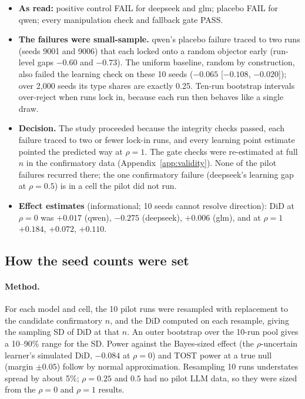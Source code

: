 \documentclass[11pt,letterpaper]{article}
\newcommand{\did}{\mathrm{DiD}}
\numberwithin{equation}{section}
\numberwithin{table}{section}
\numberwithin{figure}{section}
\numberwithin{algorithm}{section}
\begin{document}
\begin{itemize}
  \item \textbf{As read:} positive control FAIL for deepseek and glm; placebo FAIL for qwen; every manipulation check and fallback gate PASS.
  \item \textbf{The failures were small-sample.} qwen's placebo failure traced to two runs (seeds 9001 and 9006) that each locked onto a random objector early (run-level gaps $-0.60$ and $-0.73$). The uniform baseline, random by construction, also failed the learning check on these 10 seeds ($-0.065$ [$-0.108$, $-0.020$]); over 2{,}000 seeds its type shares are exactly 0.25. Ten-run bootstrap intervals over-reject when runs lock in, because each run then behaves like a single draw.
  \item \textbf{Decision.} The study proceeded because the integrity checks passed, each failure traced to two or fewer lock-in runs, and every learning point estimate pointed the predicted way at $\rho=1$. The gate checks were re-estimated at full $n$ in the confirmatory data (Appendix~\ref{app:validity}). None of the pilot failures recurred there; the one confirmatory failure (deepseek's learning gap at $\rho=0.5$) is in a cell the pilot did not run.
  \item \textbf{Effect estimates} (informational; 10 seeds cannot resolve direction): $\did$ at $\rho=0$ was $+0.017$ (qwen), $-0.275$ (deepseek), $+0.006$ (glm), and at $\rho=1$ $+0.184$, $+0.072$, $+0.110$.
\end{itemize}

\subsection{How the seed counts were set}

\paragraph{Method.} For each model and cell, the 10 pilot runs were resampled with replacement to the candidate confirmatory $n$, and the $\did$ computed on each resample, giving the sampling SD of $\did$ at that $n$. An outer bootstrap over the 10-run pool gives a 10--90\% range for the SD. Power against the Bayes-sized effect (the $\rho$-uncertain learner's simulated $\did$, $-0.084$ at $\rho=0$) and TOST power at a true null (margin $\pm0.05$) follow by normal approximation. Resampling 10 runs understates spread by about 5\%; $\rho=0.25$ and $0.5$ had no pilot LLM data, so they were sized from the $\rho=0$ and $\rho=1$ results.
\end{document}
